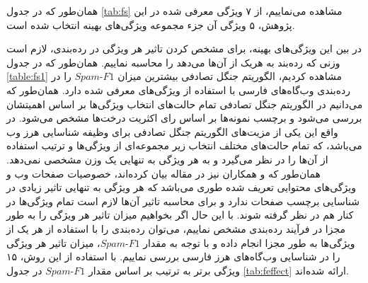 \documentclass[twoside, a4paper,11pt]{book}
\numberwithin{equation}{chapter}
\numberwithin{table}{chapter}
\numberwithin{figure}{chapter}
\numberwithin{equation}{chapter}
\begin{document}
همان‌طور که در جدول \ref{tab:fs} مشاهده می‌نماییم، از ۷ ویژگی معرفی شده در این پژوهش، ۵ ویژگی آن جزء مجموعه ویژگی‌های بهینه انتخاب شده است. 

در بین این ویژگی‌های بهینه، برای مشخص کردن تاثیر هر ویژگی در رده‌بندی، لازم است وزنی که رده‌بند به هریک از آن‌ها می‌دهد را محاسبه نماییم. همان‌طور که در جدول \ref{table:fs1} مشاهده کردیم، الگوریتم جنگل تصادفی بیشترین میزان $Spam\text{-}F1$ را در رده‌بندی وب‌گاه‌‌های فارسی با استفاده از ویژگی‌های معرفی شده دارد. همان‌طور که می‌دانیم در الگوریتم جنگل تصادفی تمام حالت‌های انتخاب ویژگی‌ها بر اساس اهمیتشان بررسی می‌شود و برچسب نمونه‌ها بر اساس رای اکثریت درخت‌ها مشخص می‌شود. در واقع این یکی از مزیت‌های الگوریتم جنگل تصادفی برای وظیفه شناسایی هرز وب می‌باشد، که تمام حالت‌های مختلف انتخاب زیر مجموعه‌ای از ویژگی‌ها و ترتیب استفاده از آن‌ها را در نظر می‌گیرد و به هر ویژگی به تنهایی یک وزن مشخصی نمی‌دهد. همان‌طور که  و همکاران نیز در مقاله \cite{Ntoulas:2006} بیان کرده‌اند، خصوصیات صفحات وب و ویژگی‌های محتوایی تعریف شده طوری می‌باشد که هر ویژگی به تنهایی تاثیر زیادی در شناسایی برچسب صفحات ندارد و برای محاسبه تاثیر آن‌ها لازم است تمام ویژگی‌ها در کنار هم در نظر گرفته شوند. با این حال اگر بخواهیم میزان تاثیر هر ویژگی را به طور مجزا در فرآیند رده‌بندی مشخص نماییم، می‌توان رده‌بندی را با استفاده از هر یک از ویژگی‌ها به طور مجزا انجام داده و با توجه به مقدار $Spam\text{-}F1$، میزان تاثیر هر ویژگی را در شناسایی وب‌گاه‌های هرز فارسی بررسی نماییم. با استفاده از این روش، ۱۵ ویژگی برتر به ترتیب بر اساس مقدار  $Spam\text{-}F1$ در جدول \ref{tab:feffect} ارائه شده‌اند.
\end{document}
